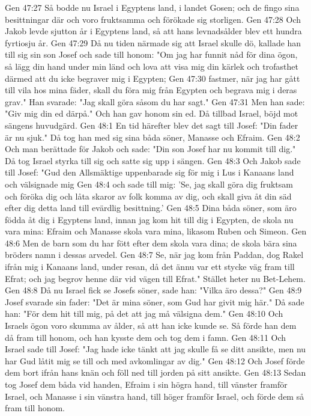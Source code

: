 Gen 47:27  Så bodde nu Israel i Egyptens land, i landet Gosen; och de fingo sina besittningar där och voro fruktsamma och förökade sig storligen.
Gen 47:28  Och Jakob levde sjutton år i Egyptens land, så att hans levnadsålder blev ett hundra fyrtiosju år.
Gen 47:29  Då nu tiden närmade sig att Israel skulle dö, kallade han till sig sin son Josef och sade till honom: "Om jag har funnit nåd för dina ögon, så lägg din hand under min länd och lova att visa mig din kärlek och trofasthet därmed att du icke begraver mig i Egypten;
Gen 47:30  fastmer, när jag har gått till vila hos mina fäder, skall du föra mig från Egypten och begrava mig i deras grav." Han svarade: "Jag skall göra såsom du har sagt."
Gen 47:31  Men han sade: "Giv mig din ed därpå." Och han gav honom sin ed. Då tillbad Israel, böjd mot sängens huvudgärd.
Gen 48:1  En tid härefter blev det sagt till Josef: "Din fader är nu sjuk." Då tog han med sig sina båda söner, Manasse och Efraim.
Gen 48:2  Och man berättade för Jakob och sade: "Din son Josef har nu kommit till dig." Då tog Israel styrka till sig och satte sig upp i sängen.
Gen 48:3  Och Jakob sade till Josef: "Gud den Allsmäktige uppenbarade sig för mig i Lus i Kanaans land och välsignade mig
Gen 48:4  och sade till mig: 'Se, jag skall göra dig fruktsam och föröka dig och låta skaror av folk komma av dig, och skall giva åt din säd efter dig detta land till evärdlig besittning.'
Gen 48:5  Dina båda söner, som äro födda åt dig i Egyptens land, innan jag kom hit till dig i Egypten, de skola nu vara mina: Efraim och Manasse skola vara mina, likasom Ruben och Simeon.
Gen 48:6  Men de barn som du har fött efter dem skola vara dina; de skola bära sina bröders namn i dessas arvedel.
Gen 48:7  Se, när jag kom från Paddan, dog Rakel ifrån mig i Kanaans land, under resan, då det ännu var ett stycke väg fram till Efrat; och jag begrov henne där vid vägen till Efrat." Stället heter nu Bet-Lehem.
Gen 48:8  Då nu Israel fick se Josefs söner, sade han: "Vilka äro dessa?"
Gen 48:9  Josef svarade sin fader: "Det är mina söner, som Gud har givit mig här." Då sade han: "För dem hit till mig, på det att jag må välsigna dem."
Gen 48:10  Och Israels ögon voro skumma av ålder, så att han icke kunde se. Så förde han dem då fram till honom, och han kysste dem och tog dem i famn.
Gen 48:11  Och Israel sade till Josef: "Jag hade icke tänkt att jag skulle få se ditt ansikte, men nu har Gud låtit mig se till och med avkomlingar av dig."
Gen 48:12  Och Josef förde dem bort ifrån hans knän och föll ned till jorden på sitt ansikte.
Gen 48:13  Sedan tog Josef dem båda vid handen, Efraim i sin högra hand, till vänster framför Israel, och Manasse i sin vänstra hand, till höger framför Israel, och förde dem så fram till honom.
